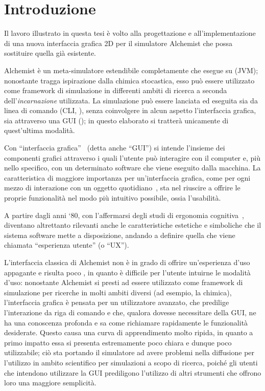 
\chapter*{Introduzione}\label{ch:intro}
    Il lavoro illustrato in questa tesi è volto alla progettazione e all'implementazione di una nuova interfaccia grafica 2D per il simulatore Alchemist che possa sostituire quella già esistente.

    Alchemist è un meta-simulatore estendibile completamente  che esegue su  (JVM);
    nonostante tragga ispirazione dalla chimica stocastica, esso può essere utilizzato come framework di simulazione in differenti ambiti di ricerca a seconda dell'\emph{incarnazione} utilizzata.
    La simulazione può essere lanciata ed eseguita sia da linea di comando (CLI, ), senza coinvolgere in alcun aspetto l'interfaccia grafica, sia attraverso una GUI ();
    in questo elaborato si tratterà unicamente di quest'ultima modalità.

    Con ``interfaccia grafica''~\cite{gui} (detta anche ``GUI'') si intende l'insieme dei componenti grafici attraverso i quali l'utente può interagire con il computer e, più nello specifico, con un determinato software che viene eseguito dalla macchina.
    La caratteristica di maggiore importanza per un'interfaccia grafica, come per ogni mezzo di interazione con un oggetto quotidiano~\cite{norman1988}, sta nel riuscire a offrire le proprie funzionalità nel modo più intuitivo possibile, ossia l'usabilità.

    A partire dagli anni `80, con l'affermarsi degli studi di ergonomia cognitiva~\cite{cognitiveErgonomics}, diventano altrettanto rilevanti anche le caratteristiche estetiche e simboliche che il sistema software mette a disposizione, andando a definire quella che viene chiamata ``esperienza utente'' (o ``UX'').

    L'interfaccia classica di Alchemist non è in grado di offrire un'esperienza d'uso appagante e risulta poco , in quanto è difficile per l'utente intuirne le modalità d'uso:
    nonostante Alchemist si presti ad essere utilizzato come framework di simulazione per ricerche in molti ambiti diversi (ad esempio, la chimica), l'interfaccia grafica è pensata per un utilizzatore avanzato, che predilige l'interazione da riga di comando e che, qualora dovesse necessitare della GUI, ne ha una conoscenza profonda e sa come richiamare rapidamente le funzionalità desiderate.
    Questo causa una curva di apprendimento molto ripida, in quanto a primo impatto essa si presenta estremamente poco chiara e dunque poco utilizzabile;
    ciò sta portando il simulatore ad avere problemi nella diffusione per l'utilizzo in ambito scientifico per simulazioni a scopo di ricerca, poiché gli utenti che intendono utilizzare la GUI prediligono l'utilizzo di altri strumenti che offrono loro una maggiore semplicità.

